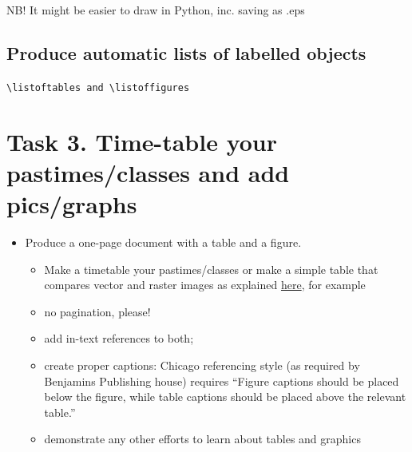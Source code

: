 \documentclass[a4paper,11pt]{article}
\begin{document}
NB! It might be easier to draw in Python, inc. saving as .eps

\subsection{Produce automatic lists of labelled objects}

\verb|\listoftables and \listoffigures|

\listoftables
\listoffigures

\section*{Task 3. Time-table your pastimes/classes and add pics/graphs}
\label{task}

\begin{tcolorbox}[width=\textwidth, colback={yellow!40!white}, title={}, colbacktitle=yellow!60!white, coltitle=black]
	\begin{itemize}
		\item Produce a one-page document with a table and a figure. 
		\begin{itemize}
			\item Make a timetable your pastimes/classes or make a simple table that compares vector and raster images as explained  \href{https://tinyurl.com/yf8orxog}{here}, for example
			\item no pagination, please!
			\item add in-text references to both;
			\item create proper captions: Chicago referencing style (as required by Benjamins  Publishing house) requires ``Figure captions should be placed below the figure, while table captions should be placed above the relevant table.''
			\item demonstrate any other efforts to learn about tables and graphics 
		\end{itemize} 
	\end{itemize}
	
\end{tcolorbox}%
\end{document}
